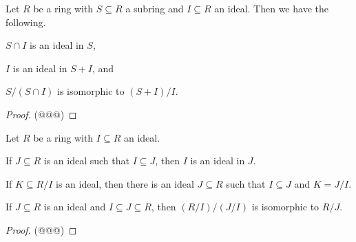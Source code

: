 \begin{prop}
Let \(R\) be a ring with \(S \subseteq R\) a subring and \(I \subseteq R\) an ideal.
Then we have the following.
\begin{proplist}
\item \(S \cap I\) is an ideal in \(S\),
\item \(I\) is an ideal in \(S + I\), and
\item \(S/(S \cap I)\) is isomorphic to \((S+I)/I\).
\end{proplist}
\end{prop}

\begin{proof}
(@@@)
\end{proof}

\begin{prop}
Let \(R\) be a ring with \(I \subseteq R\) an ideal.
\begin{proplist}
\item If \(J \subseteq R\) is an ideal such that \(I \subseteq J\), then \(I\) is an ideal in \(J\).
\item If \(K \subseteq R/I\) is an ideal, then there is an ideal \(J \subseteq R\) such that \(I \subseteq J\) and \(K = J/I\).
\item If \(J \subseteq R\) is an ideal and \(I \subseteq J \subseteq R\), then \((R/I)/(J/I)\) is isomorphic to \(R/J\).
\end{proplist}
\end{prop}

\begin{proof}
(@@@)
\end{proof}
